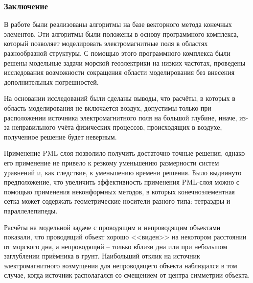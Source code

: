 \documentclass[aspectratio=43]{beamer}
\newcommand{\MakeTitle}[1]{\frametitle{\hspace{1.5em}\textbf{#1} \hfill \insertframenumber{} }}
\begin{document}
\begin{frame}
	\MakeTitle{Заключение}
	В работе были реализованы алгоритмы на базе векторного метода конечных элементов. Эти алгоритмы были положены в основу программного комплекса, который позволяет моделировать электромагнитные поля в областях разнообразной структуры. С помощью этого программного комплекса были решены модельные задачи морской геоэлектрики на низких частотах, проведены исследования возможности сокращения области моделирования без внесения дополнительных погрешностей.

	На основании исследований были сделаны выводы, что расчёты, в которых в область моделирования не включается воздух, допустимы только при расположении источника электромагнитного поля на большой глубине, иначе, из-за неправильного учёта физических процессов, происходящих в воздухе, полученное решение будет неверным.

	Применение PML-слоя позволило получить достаточно точные решения, однако его применение не привело к резкому уменьшению размерности систем уравнений и, как следствие, к уменьшению времени решения. Было выдвинуто предположение, что увеличить эффективность применения PML-слоя можно с помощью применения неконформных методов, в которых конечноэлементная сетка может содержать геометрические носители разного типа: тетраэдры и параллелепипеды.

	Расчёты на модельной задаче с проводящим и непроводящим объектами показали, что проводящий объект хорошо <<виден>> на некотором расстоянии от морского дна, а непроводящий -- только вблизи дна или при небольшом заглублении приёмника в грунт. Наибольший отклик на источник электромагнитного возмущения для непроводящего объекта наблюдался в том случае, когда источник располагался со смещением от центра симметрии объекта.
\end{frame}


\end{document}
